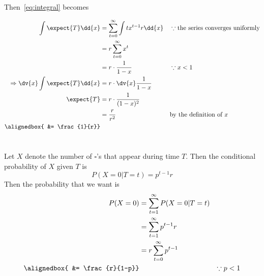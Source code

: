 \documentclass[
  coursecode={MTHE 455},
  assignmentname={Assignment \assignmentnumber},
  studentnumber=20053722,
  name={Bryan Hoang}
]{
  ltxanswer%
}
\begin{document}
\begin{questions}
\begin{parts}
\begin{solution}
        \newpage
        Then~\eqref{eq:integral} becomes

        \begin{align*}
          \int \expect{T} \dd{x}                    &= \sum_{t=0}^{\infty} \int tx^{t-1}r \dd{x} & &\because \text{the series converges uniformly} \\
                                                    &= r\sum_{t=0}^{\infty} x^{t}                                                                  \\
                                                    &= r \cdot \frac{1}{1-x}                     & &\because x < 1                                 \\
          \Rightarrow \dv{x} \int \expect{T} \dd{x} &= r \cdot \dv{x} \frac{1}{1-x}                                                                \\
          \expect{T}                                &= r \cdot \frac{1}{(1-x)^{2}}                                                                 \\
                                                    &= \frac{r}{r^2}                             & &\text{by the definition of } x                 \\
          \alignedbox{                              &= \frac{1}{r}}
        \end{align*}
      \end{solution}

      \part{}
      \begin{solution}
        Let \(X\) denote the number of \(\square{}\)'s that appear during time \(T\).
        Then the conditional probability of \(X\) given \(T\) is
        \begin{equation*}
          P(X=0|T=t) = p^{t-1}r
        \end{equation*}
        Then the probability that we want is
        \begin{align*}
          P(X=0)       &= \sum_{t=1}^{\infty} P(X=0|T=t)                   \\
                       &= \sum_{t=1}^{\infty} p^{t-1}r                     \\
                       &= r\sum_{t=0}^{\infty} p^{t-1}                     \\
          \alignedbox{ &= \frac{r}{1-p}}                 & &\because p < 1
        \end{align*}
      \end{solution}
    \end{parts}
  \end{questions}
\end{document}
